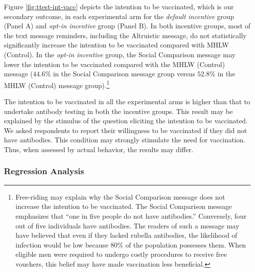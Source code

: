 \documentclass[
      12pt,
    a4paper
]{article}
\begin{document}
Figure \ref{fig:ttest-int-vacc} depicts the intention to be vaccinated, which is our secondary outcome, in each experimental arm for the \emph{default incentive} group (Panel A) and \emph{opt-in incentive} group (Panel B). In both incentive groups, most of the text message reminders, including the Altruistic message, do not statistically significantly increase the intention to be vaccinated compared with MHLW (Control). In the \emph{opt-in incentive} group, the Social Comparison message may lower the intention to be vaccinated compared with the MHLW (Control) message (\(44.6\)\% in the Social Comparison message group versus \(52.8\)\% in the MHLW (Control) message group).\footnote{Free-riding may explain why the Social Comparison message does not increase the intention to be vaccinated. The Social Comparison message emphasizes that ``one in five people do not have antibodies.'' Conversely, four out of five individuals have antibodies. The readers of such a message may have believed that even if they lacked rubella antibodies, the likelihood of infection would be low because 80\% of the population possesses them. When eligible men were required to undergo costly procedures to receive free vouchers, this belief may have made vaccination less beneficial.}

The intention to be vaccinated in all the experimental arms is higher than that to undertake antibody testing in both the incentive groups. This result may be explained by the stimulus of the question eliciting the intention to be vaccinated. We asked respondents to report their willingness to be vaccinated if they did not have antibodies. This condition may strongly stimulate the need for vaccination. Thus, when assessed by actual behavior, the results may differ.

\hypertarget{regression-analysis}{%
\subsubsection{Regression Analysis}\label{regression-analysis}}
\end{document}
